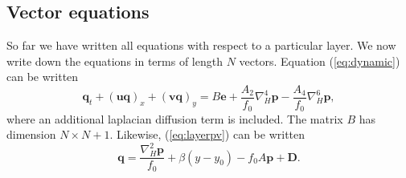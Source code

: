 \documentclass[11pt, a4paper,twoside]{article}
\newcommand{\vc}[1]{\mathbf{#1}}
\numberwithin{equation}{section}
\begin{document}
\subsection{Vector equations}

So far we have written all equations with respect to a particular layer. We now write down the equations in terms of length $N$ vectors. Equation (\ref{eq:dynamic}) can be written
\begin{equation}
\vc{q}_t  + \left(\vc{u}\vc{q}\right)_x  + \left(\vc{v}\vc{q}\right)_y  = B\vc{e} + \frac{A_2}{f_0}\nabla_H^4\vc{p} - \frac{A_4}{f_0}\nabla_H^6\vc{p},
\end{equation}
where an additional laplacian diffusion term is included. The matrix $B$ has dimension $N \times N+1$. Likewise, (\ref{eq:layerpv}) can be written
\begin{equation}
\vc{q} = \frac{\nabla_H^2 \vc{p}}{f_0} + \beta(y - y_0) - f_0A\vc{p} + \vc{D}.
\end{equation}
\end{document}
